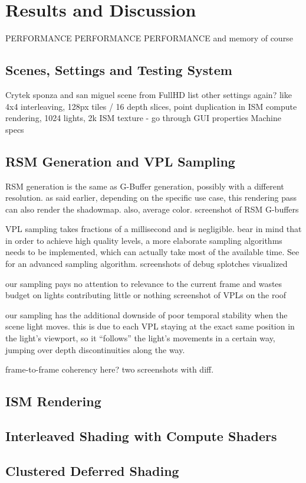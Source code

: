 

\chapter{Results and Discussion}

PERFORMANCE PERFORMANCE PERFORMANCE
and memory of course
\section{Scenes, Settings and Testing System}
\begin{outline}
\1 Crytek sponza and san miguel scene from \citep{McGuire2011Data}
\1 FullHD
\1 list other settings again? like 4x4 interleaving, 128px tiles / 16 depth slices, point duplication in ISM compute rendering, 1024 lights, 2k ISM texture
    - go through GUI properties
\1 Machine specs
\end{outline}

\section{RSM Generation and VPL Sampling}
\begin{outline}
\1 RSM generation is the same as G-Buffer generation, possibly with a different resolution. as said earlier, depending on the specific use case, this rendering pass can also render the shadowmap. also, average color.
\1 screenshot of RSM G-buffers

\1 VPL sampling takes fractions of a millisecond and is negligible. bear in mind that in order to achieve high quality levels, a more elaborate sampling algorithms needs to be implemented, which can actually take most of the available time. See \citep{hedman2016sequential} for an advanced sampling algorithm.
\1 screenshots of debug splotches visualized

\1 our sampling pays no attention to relevance to the current frame and wastes budget on lights contributing little or nothing
\1 screenshot of VPLs on the roof

\1 our sampling has the additional downside of poor temporal stability when the scene light moves. this is due to each VPL staying at the exact same position in the light's viewport, so it ``follows'' the light's movements in a certain way, jumping over depth discontinuities along the way.

\1 frame-to-frame coherency here? two screenshots with diff.
\end{outline}


\section{ISM Rendering}



\section{Interleaved Shading with Compute Shaders}



\section{Clustered Deferred Shading}

